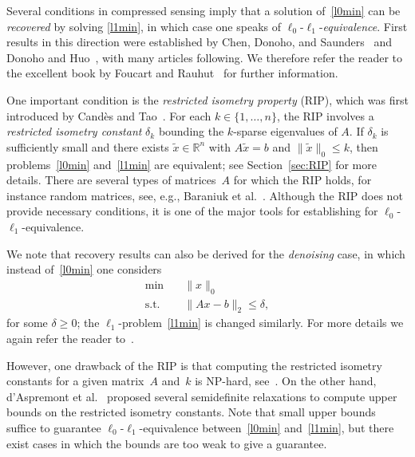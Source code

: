 \documentclass[journal]{IEEEtran}
\newcommand{\Norm}[2]{\lVert{#1}\rVert_{#2}}
\newcommand{\R}{\mathds{R}}
\begin{document}
%


Several conditions in compressed sensing imply that a solution
of~\eqref{l0min} can be \emph{recovered} by solving \eqref{l1min}, in which
case one speaks of $\ell_0$-$\ell_1$-\emph{equivalence}. First results in
this direction were established by Chen, Donoho, and
Saunders~\cite{CheDS99} and Donoho and Huo~\cite{DH01}, with many articles
following. We therefore refer the reader to the excellent book by Foucart
and Rauhut~\cite{FouR13} for further information.

One important condition is the \emph{restricted isometry property} (RIP),
which was first introduced by Cand\`es and Tao~\cite{CT05}. For each $k \in
\{1, \dots, n\}$, the RIP involves a \emph{restricted isometry constant}
$\delta_k$ bounding the $k$-sparse eigenvalues of $A$. If $\delta_k$ is sufficiently small
and there exists $\tilde{x} \in \R^n$ with $A \tilde{x} = b$ and
$\Norm{\tilde{x}}{0} \leq k$, then problems~\eqref{l0min} and~\eqref{l1min}
are equivalent; see Section~\ref{sec:RIP} for more details. There are
several types of matrices~$A$ for which the RIP holds, for instance random
matrices, see, e.g., Baraniuk et al.~\cite{BDDW08}. Although the RIP does
not provide necessary conditions, it is one of the major tools for
establishing for $\ell_0$-$\ell_1$-equivalence.

We note that recovery results can also be derived for the \emph{denoising}
case, in which instead of~\eqref{l0min} one considers
\begin{align}\label{l0minDenoising}
  \min \quad & \Norm{x}{0} \tag{$P_0^\delta$}\\
  \text{s.t.} \quad & \Norm{Ax - b}{2} \leq \delta, \nonumber
\end{align}
for some $\delta \geq 0$; the $\ell_1$-problem~\eqref{l1min} is changed
similarly. For more details we again refer the reader to~\cite{FouR13}.

However, one drawback of the RIP is that computing the restricted isometry
constants for a given matrix~$A$ and~$k$ is NP-hard, see~\cite{PT14}. On
the other hand, d'Aspremont et al.~\cite{Asp07,Asp08} proposed several
semidefinite relaxations to compute upper bounds on the restricted isometry
constants. Note that small upper bounds suffice to guarantee
$\ell_0$-$\ell_1$-equivalence between~\eqref{l0min} and~\eqref{l1min}, but
there exist cases in which the bounds are too weak to give a guarantee.
\end{document}
